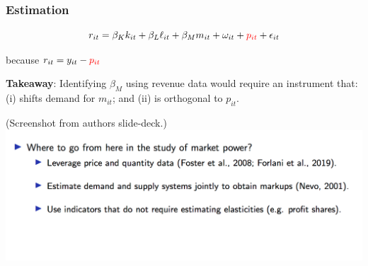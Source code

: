 \documentclass[11pt, aspectratio=169]{beamer}
\newcommand{\Skip}{\vspace{1em}}
\begin{document}
\begin{frame}[c]\frametitle{Estimation}

\[    
 r_{it} = \beta_{K} k_{it} + \beta_{L}\ell_{it} + \beta_{M} m_{it} + 
 \omega_{it} + \textcolor{red}{p_{it}} + \epsilon_{it}   
\]

because $r_{it} = y_{it} - \textcolor{red}{p_{it}}$

\Skip
\textbf{Takeaway}: Identifying $\beta_M$ using revenue data would require an instrument
that: (i) shifts demand for $m_{it}$; and (ii) is orthogonal to $p_{it}$.

\Skip\Skip
(Screenshot from authors slide-deck.)
\Skip
\includegraphics[height=0.45\textheight]{BondScreenshot.png}

\end{frame}


\end{document}
